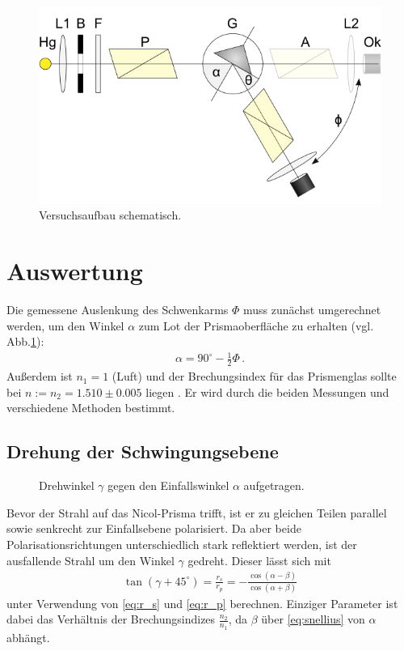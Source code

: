 \documentclass[12pt,a4paper,titlepage,headinclude,bibtotoc]{scrartcl}
\begin{document}
\begin{figure}[!h]
	\centering
	\includegraphics[scale=0.5]{aufbau_schema.png}
	\caption{Versuchsaufbau schematisch. \cite[Datum: 23.03.2015]{LP20}}
	\label{fig:aufbau}
\end{figure}

\section{Auswertung}
\label{sec:auswertung}
Die gemessene Auslenkung des Schwenkarms $\Phi$ muss zunächst umgerechnet werden, um den Winkel $\alpha$ zum Lot der Prismaoberfläche zu erhalten (vgl. Abb.\ref{fig:aufbau}):\\
\begin{align}
	\alpha=90^\circ-\frac{1}{2}\Phi\,.
\end{align}
Außerdem ist $n_1=1$ (Luft) und der Brechungsindex für das Prismenglas sollte bei $n := n_2=1.510 \pm 0.005$ liegen \cite[S.181]{prakti}.
Er wird durch die beiden Messungen und verschiedene Methoden bestimmt.

\subsection{Drehung der Schwingungsebene}

\begin{figure}[!htb]
	\centering
	
	\caption{Drehwinkel $\gamma$ gegen den Einfallswinkel $\alpha$ aufgetragen.}
	\label{fig:drehwinkel}
\end{figure}

Bevor der Strahl auf das Nicol-Prisma trifft, ist er zu gleichen Teilen parallel sowie senkrecht zur Einfallsebene polarisiert.
Da aber beide Polarisationsrichtungen unterschiedlich stark reflektiert werden, ist der ausfallende Strahl um den Winkel $\gamma$ gedreht.
Dieser lässt sich mit
\begin{align}
	\tan(\gamma+45^\circ)=\frac{r_s}{r_p}=-\frac{\cos(\alpha-\beta)}{\cos(\alpha+\beta)}
	\label{eq:theorie}
\end{align}
unter Verwendung von \eqref{eq:r_s} und \eqref{eq:r_p} berechnen.
Einziger Parameter ist dabei das Verhältnis der Brechungsindizes $\frac{n_2}{n_1}$, da $\beta$ über \eqref{eq:snellius} von $\alpha$ abhängt.
\end{document}
